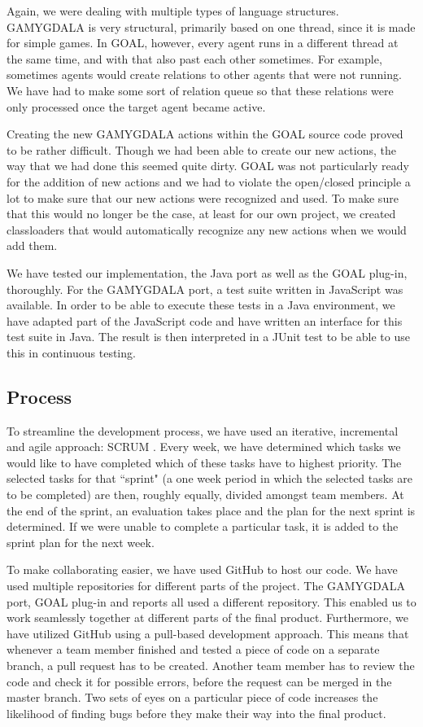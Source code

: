Again, we were dealing with multiple types of language structures. GAMYGDALA is very structural, primarily based on one thread, since it is made for simple games. In GOAL, however, every agent runs in a different thread at the same time, and with that also past each other sometimes. For example, sometimes agents would create relations to other agents that were not running. We have had to make some sort of relation queue so that these relations were only processed once the target agent became active.

Creating the new GAMYGDALA actions within the GOAL source code proved to be rather difficult. Though we had been able to create our new actions, the way that we had done this seemed quite dirty. GOAL was not particularly ready for the addition of new actions and we had to violate the open/closed principle a lot to make sure that our new actions were recognized and used. To make sure that this would no longer be the case, at least for our own project, we created classloaders that would automatically recognize any new actions when we would add them.

We have tested our implementation, the Java port as well as the GOAL plug-in, thoroughly. For the GAMYGDALA port, a test suite written in JavaScript was available. In order to be able to execute these tests in a Java environment, we have adapted part of the JavaScript code and have written an interface for this test suite in Java. The result is then interpreted in a JUnit test to be able to use this in continuous testing.

\subsection{Process}
To streamline the development process, we have used an iterative, incremental and agile approach: SCRUM \citep{scrum}. Every week, we have determined which tasks we would like to have completed which of these tasks have to highest priority. The selected tasks for that ``sprint" (a one week period in which the selected tasks are to be completed) are then, roughly equally, divided amongst team members. At the end of the sprint, an evaluation takes place and the plan for the next sprint is determined. If we were unable to complete a particular task, it is added to the sprint plan for the next week.

To make collaborating easier, we have used GitHub \citep{gh} to host our code. We have used multiple repositories for different parts of the project. The GAMYGDALA port, GOAL plug-in and reports all used a different repository. This enabled us to work seamlessly together at different parts of the final product. Furthermore, we have utilized GitHub using a pull-based development approach. This means that whenever a team member finished and tested a piece of code on a separate branch, a pull request has to be created. Another team member has to review the code and check it for possible errors, before the request can be merged in the master branch. Two sets of eyes on a particular piece of code increases the likelihood of finding bugs before they make their way into the final product. 

